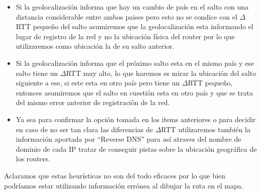 \begin{itemize}
\item Si la geolocalización informa que hay un cambio de país en el salto con una distancia considerable entre ambos paises pero esto no se condice con el $\Delta$RTT pequeño del salto asumiremos que la geolocalización esta informando el lugar de registro de la red y no la ubicación física del router por lo que utilizaremos como ubicación la de su salto anterior.
\item Si la geolocalización informa que el próximo salto esta en el mismo país y ese salto tiene un $\Delta$RTT muy alto, lo que haremos es mirar la ubicación del salto siguiente a ese, si este esta en otro país pero tiene un $\Delta$RTT pequeño, entonces asumiremos que el salto en cuestión esta en otro país y que se trata del mismo error anterior de registración de la red.
\item Ya sea para confirmar la opción tomada en los items anteriores o para decidir en caso de no ser tan clara las diferencias de $\Delta$RTT utilizaremos también la información aportada por ``Reverse DNS'' para así atraves del nombre de dominio de cada IP tratar de conseguir pistas sobre la ubicación geográfica de los routers.
\end{itemize}

Aclaramos que estas heurísticas no son del todo eficaces por lo que bien podríamos estar utilizando información errónea al dibujar la ruta en el mapa.

